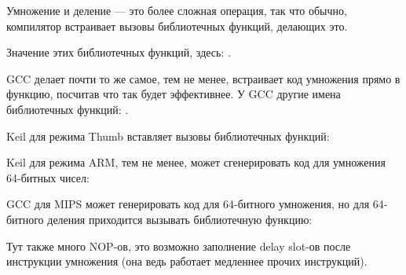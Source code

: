 ﻿






Умножение и деление --- это более сложная операция, так что обычно, компилятор встраивает вызовы библиотечных функций,
делающих это.

Значение этих библиотечных функций, здесь: .



GCC делает почти то же самое, тем не менее,
встраивает код умножения прямо в функцию, посчитав что так будет эффективнее.
У GCC другие имена библиотечных функций: .


Keil для режима Thumb вставляет вызовы библиотечных функций:



Keil для режима ARM, тем не менее, может сгенерировать код для умножения 64-битных чисел:





\Optimizing GCC для MIPS может генерировать код для 64-битного умножения, но для 64-битного деления приходится вызывать библиотечную функцию:



Тут также много \ac{NOP}-ов, это возможно заполнение delay slot-ов после инструкции умножения (она ведь работает
медленнее прочих инструкций).

